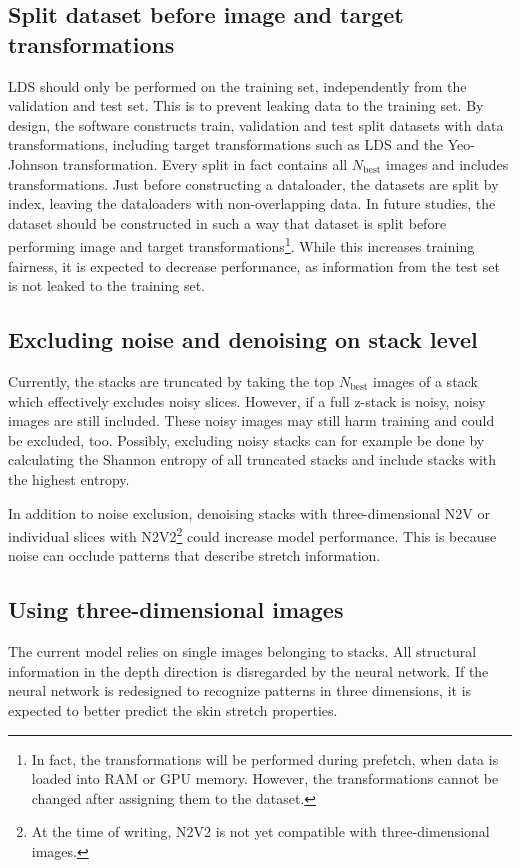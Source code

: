 \subsection{Split dataset before image and target transformations}
LDS should only be performed on the training set, independently from the validation and test set.
This is to prevent leaking data to the training set.
By design, the software constructs train, validation and test split datasets with data transformations, including target transformations such as LDS and the Yeo-Johnson transformation.
Every split in fact contains all $N_\mathrm{best}$ images and includes transformations.
Just before constructing a dataloader, the datasets are split by index, leaving the dataloaders with non-overlapping data.
In future studies, the dataset should be constructed in such a way that dataset is split before performing image and target transformations\footnote{In fact, the transformations will be performed during prefetch, \ie when data is loaded into RAM or GPU memory. However, the transformations cannot be changed after assigning them to the dataset.}.
While this increases training fairness, it is expected to decrease performance, as information from the test set is not leaked to the training set.


\subsection{Excluding noise and denoising on stack level}
Currently, the stacks are truncated by taking the top $N_\mathrm{best}$ images of a stack which effectively excludes noisy slices.
However, if a full z-stack is noisy, noisy images are still included.
These noisy images may still harm training and could be excluded, too.
Possibly, excluding noisy stacks can for example be done by calculating the Shannon entropy of all truncated stacks and include stacks with the highest entropy.

In addition to noise exclusion, denoising stacks with three-dimensional N2V or individual slices with N2V2\footnote{At the time of writing, N2V2 is not yet compatible with three-dimensional images.} could increase model performance.
This is because noise can occlude patterns that describe stretch information.

\subsection{Using three-dimensional images}
The current model relies on single images belonging to stacks.
All structural information in the depth direction is disregarded by the neural network.
If the neural network is redesigned to recognize patterns in three dimensions, it is expected to better predict the skin stretch properties.

